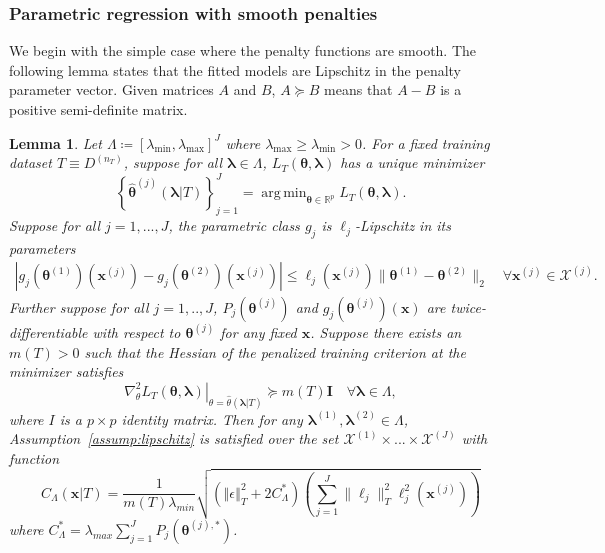 \documentclass[12pt]{article} %
\newtheorem{lemma}{Lemma}
\theoremstyle{definition}
\DeclareMathOperator*{\argmin}{arg\,min}
\begin{document}
\subsubsection{Parametric regression with smooth penalties}
\label{sec:param_smooth}
We begin with the simple case where the penalty functions are smooth. The following lemma states that the fitted models are Lipschitz in the penalty parameter vector.
Given matrices $A$ and $B$, $A \succeq B$ means that $A - B$ is a positive semi-definite matrix.
\begin{lemma}
	\label{lemma:param_add}
	Let $\Lambda \coloneqq \left [ \lambda_{\min}, \lambda_{\max} \right ]^J$ where $\lambda_{\max} \ge \lambda_{\min} > 0$.
	For a fixed training dataset $T \equiv D^{(n_T)}$, suppose for all $\boldsymbol{\lambda} \in \Lambda$, $L_T \left (\boldsymbol{\theta}, \boldsymbol{\lambda} \right)$ has a unique minimizer
	\begin{equation}
	\label{eq:param_add_estimator}
	\left\{
	\hat{\boldsymbol{\theta}}^{(j)}\left (\boldsymbol{\lambda} | T \right )
	\right\}_{j=1}^J =
	\argmin_{\boldsymbol{\theta} \in \mathbb{R}^p} L_T \left (\boldsymbol{\theta}, \boldsymbol{\lambda} \right).
	\end{equation}
	Suppose for all $j = 1,...,J$, the parametric class $g_j$ is $\ell_j$-Lipschitz in its parameters
	\begin{align}
	\left|
	g_j (\boldsymbol{\theta}^{(1)} )(\boldsymbol{x}^{(j)})
	-g_j (\boldsymbol{\theta}^{(2)} )(\boldsymbol{x}^{(j)})
	\right|
	\le
	\ell_j (\boldsymbol{x}^{(j)})
	\|\boldsymbol{\theta}^{(1)}-\boldsymbol{\theta}^{(2)}\|_{2}
	\quad
	\forall \boldsymbol{x}^{(j)} \in \mathcal{X}^{(j)}.
	\label{eq:lipschitz_g}
	\end{align}
	Further suppose for all $j=1,..,J$, $P_j(\boldsymbol{\theta}^{(j)})$ and $g_j(\boldsymbol{\theta}^{(j)})(\boldsymbol{x})$ are twice-differentiable with respect to $\boldsymbol{\theta}^{(j)}$ for any fixed $\boldsymbol{x}$.
	Suppose there exists an $m(T) > 0$ such that the Hessian of the penalized training criterion at the minimizer satisfies
	\begin{equation}
	\left . \nabla_{\theta}^2 L_T \left (\boldsymbol{\theta}, \boldsymbol{\lambda} \right) \right |_{\theta = \hat{\theta}(\boldsymbol{\lambda} | T )} \succeq m(T) \boldsymbol{I}
	\quad \forall \boldsymbol{\lambda} \in \Lambda,
	\label{eq:smooth_pos_def}
	\end{equation}
	where $I$ is a $p \times p$ identity matrix.
	Then for any $\boldsymbol{\lambda}^{(1)}, \boldsymbol{\lambda}^{(2)} \in \Lambda$,
	Assumption~\ref{assump:lipschitz} is satisfied over the set $\mathcal{X}^{(1)} \times ... \times \mathcal{X}^{(J)}$ with function
	\begin{equation}
	\label{eq:param_add_lipschitz}
	C_\Lambda(\boldsymbol{x} | T) =
	\frac{1}{m(T) \lambda_{min}}
	\sqrt{
		\left(
		\left\Vert \epsilon \right \Vert_T^2 + 2 C^*_{\Lambda}
		\right)
		\left(
		\sum_{j=1}^J  \|\ell_j\|_T^2 \ell_j^2(\boldsymbol{x}^{(j)})
		\right)
	}
	\end{equation}
	where $C^*_{\Lambda} = \lambda_{max}\sum_{j=1}^{J} P_{j}(\boldsymbol{\theta}^{(j),*})$.
\end{lemma}
\end{document}
